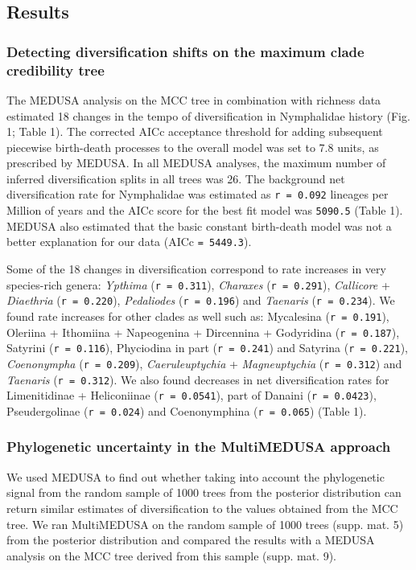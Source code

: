 \documentclass[10pt]{article}
\begin{document}
\subsection*{Results}

\subsubsection*{Detecting diversification shifts on the maximum clade
credibility
tree}

The MEDUSA analysis on the MCC tree in combination with richness data
estimated 18 changes in the tempo of diversification in Nymphalidae
history (Fig. 1; Table 1). The corrected AICc acceptance threshold for
adding subsequent piecewise birth-death processes to the overall model
was set to 7.8 units, as prescribed by MEDUSA. In all MEDUSA analyses,
the maximum number of inferred diversification splits in all trees was
26. The background net diversification rate for Nymphalidae was
estimated as \texttt{r = 0.092} lineages per Million of years and the
AICc score for the best fit model was \texttt{5090.5} (Table 1). MEDUSA
also estimated that the basic constant birth-death model was not a
better explanation for our data (AICc \texttt{= 5449.3}).

Some of the 18 changes in diversification correspond to rate increases
in very species-rich genera: \emph{Ypthima} (\texttt{r = 0.311}),
\emph{Charaxes} (\texttt{r = 0.291}), \emph{Callicore} +
\emph{Diaethria} (\texttt{r = 0.220}), \emph{Pedaliodes}
(\texttt{r = 0.196}) and \emph{Taenaris} (\texttt{r = 0.234}). We found
rate increases for other clades as well such as: Mycalesina
(\texttt{r = 0.191}), Oleriina + Ithomiina + Napeogenina + Dircennina +
Godyridina (\texttt{r = 0.187}), Satyrini (\texttt{r = 0.116}),
Phyciodina in part (\texttt{r = 0.241}) and Satyrina
(\texttt{r = 0.221}), \emph{Coenonympha} (\texttt{r = 0.209}),
\emph{Caeruleuptychia} + \emph{Magneuptychia} (\texttt{r = 0.312}) and
\emph{Taenaris} (\texttt{r = 0.312}). We also found decreases in net
diversification rates for Limenitidinae + Heliconiinae
(\texttt{r = 0.0541}), part of Danaini (\texttt{r = 0.0423}),
Pseudergolinae (\texttt{r = 0.024}) and Coenonymphina
(\texttt{r = 0.065}) (Table 1).

\subsubsection*{Phylogenetic uncertainty in the MultiMEDUSA
approach}

We used MEDUSA to find out whether taking into account the phylogenetic
signal from the random sample of 1000 trees from the posterior
distribution can return similar estimates of diversification to the
values obtained from the MCC tree. We ran MultiMEDUSA on the random
sample of 1000 trees (supp. mat. 5) from the posterior distribution and
compared the results with a MEDUSA analysis on the MCC tree derived from
this sample (supp. mat. 9).
\end{document}
